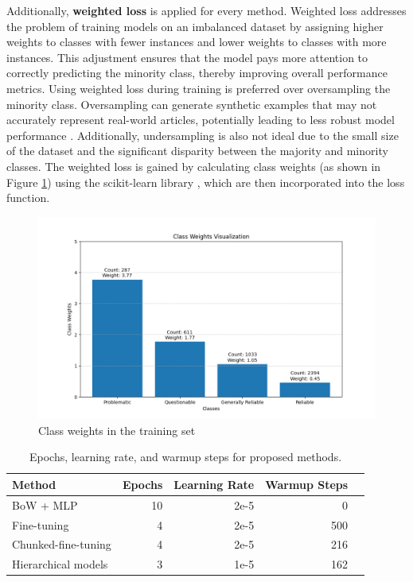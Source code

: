 Additionally, \textbf{weighted loss} is applied for every method. Weighted loss addresses the problem of training models on an imbalanced dataset by assigning higher weights to classes with fewer instances and lower weights to classes with more instances. This adjustment ensures that the model pays more attention to correctly predicting the minority class, thereby improving overall performance metrics. Using weighted loss during training is preferred over oversampling the minority class. Oversampling can generate synthetic examples that may not accurately represent real-world articles, potentially leading to less robust model performance \cite{alkhawaldeh-2023-challenges}. Additionally, undersampling is also not ideal due to the small size of the dataset and the significant disparity between the majority and minority classes. The weighted loss is gained by calculating class weights (as shown in Figure \ref{fig:class_weights}) using the scikit-learn library \cite{pedregosa-2011-scikit-learn}, which are then incorporated into the loss function.

\begin{figure}[htbp]
    \centering
    \includegraphics[width=0.8\linewidth]{figures/class_weights.png}
    \caption{Class weights in the training set}
    \label{fig:class_weights}
\end{figure}


\begin{table}[htbp]
    \centering
    \small
    \begin{tabular}{| l | r | r | r | r |}
        \hline                            \textbf{Method} & \textbf{Epochs} & \textbf{Learning Rate} & \textbf{Warmup Steps} \\
        \hline
        BoW + MLP                                         & 10              & 2e-5                   & 0                     \\
        \hline
        Fine-tuning                                       & 4               & 2e-5                   & 500                   \\
        \hline
        Chunked-fine-tuning                               & 4               & 2e-5                   & 216                   \\
        \hline
        Hierarchical models                               & 3               & 1e-5                   & 162                   \\
        \hline
    \end{tabular}
    \caption{Epochs, learning rate, and warmup steps for proposed methods.}
    \label{table:hyperparameters}
\end{table}

